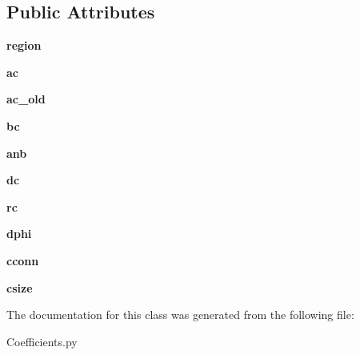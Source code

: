 \subsection*{Public Attributes}
\begin{DoxyCompactItemize}
\item 
\mbox{\label{classpy_f_v_m_1_1_coefficients_1_1_coefficients_ae9c37cac64bb39fa28bd89476e7bd0a4}} 
{\bfseries region}
\item 
\mbox{\label{classpy_f_v_m_1_1_coefficients_1_1_coefficients_a572af102449147da428c746d84a1753d}} 
{\bfseries ac}
\item 
\mbox{\label{classpy_f_v_m_1_1_coefficients_1_1_coefficients_a1a06ab7059acfb2154dd96a5358e1b89}} 
{\bfseries ac\+\_\+old}
\item 
\mbox{\label{classpy_f_v_m_1_1_coefficients_1_1_coefficients_a310bf30a4c4a644051bb702cf84a65a8}} 
{\bfseries bc}
\item 
\mbox{\label{classpy_f_v_m_1_1_coefficients_1_1_coefficients_aba8e87efdfa149c8a645fa41e50b5073}} 
{\bfseries anb}
\item 
\mbox{\label{classpy_f_v_m_1_1_coefficients_1_1_coefficients_aa29dc9f5174b9a1068a5536162d92bb8}} 
{\bfseries dc}
\item 
\mbox{\label{classpy_f_v_m_1_1_coefficients_1_1_coefficients_a5defe2d2a2ae7d99a1c0a7b6f915ffd7}} 
{\bfseries rc}
\item 
\mbox{\label{classpy_f_v_m_1_1_coefficients_1_1_coefficients_a99453702e4f0ebc625f38322dc8b9edc}} 
{\bfseries dphi}
\item 
\mbox{\label{classpy_f_v_m_1_1_coefficients_1_1_coefficients_ada3fbb6e9a7052930428debf67facbbc}} 
{\bfseries cconn}
\item 
\mbox{\label{classpy_f_v_m_1_1_coefficients_1_1_coefficients_aa5de9beb72681ca974e5d615e252a94f}} 
{\bfseries csize}
\end{DoxyCompactItemize}


The documentation for this class was generated from the following file\+:\begin{DoxyCompactItemize}
\item 
Coefficients.\+py\end{DoxyCompactItemize}
